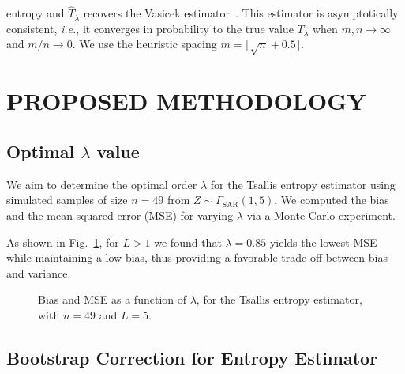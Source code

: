 \documentclass[
  lettersize  journal,
]{IEEEtran}%
\begin{document}
entropy and \(\widehat T_{\lambda}\) recovers the Vasicek
estimator~. This estimator is
asymptotically consistent, \emph{i.e.}, it converges in probability to
the true value \(T_\lambda\) when \(m,n\rightarrow\infty\) and
\(m/n\rightarrow0\). We use the heuristic spacing
\(m=\lfloor\sqrt{n}+0.5\rfloor\).

\section{PROPOSED METHODOLOGY}\label{sec:met}

\subsection{\texorpdfstring{Optimal \(\lambda\)
value}{Optimal \textbackslash lambda value}}\label{optimal-lambda-value}

We aim to determine the optimal order \(\lambda\) for the Tsallis
entropy estimator using simulated samples of size \(n = 49\) from
\(Z\sim \Gamma_{\text{SAR}}(1,5)\). We computed the bias and the mean
squared error (MSE) for varying \(\lambda\) via a Monte Carlo
experiment.

As shown in Fig.~\ref{fig-optimal_order-tsallis}, for \(L>1\) we found
that \(\lambda=0.85\) yields the lowest MSE while maintaining a low
bias, thus providing a favorable trade-off between bias and variance.

\begin{figure}[H]


\caption{\label{fig-optimal_order-tsallis}Bias and MSE as a function of
\(\lambda\), for the Tsallis entropy estimator, with \(n = 49\) and
\(L = 5\).}

\end{figure}%

\subsection{Bootstrap Correction for Entropy
Estimator}\label{bootstrap-correction-for-entropy-estimator}
\end{document}
